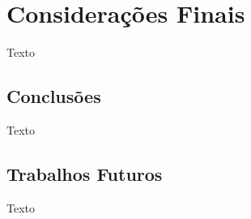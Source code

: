\chapter{Considerações Finais}

Texto

\section{Conclusões}

Texto

\section{Trabalhos Futuros}

Texto

